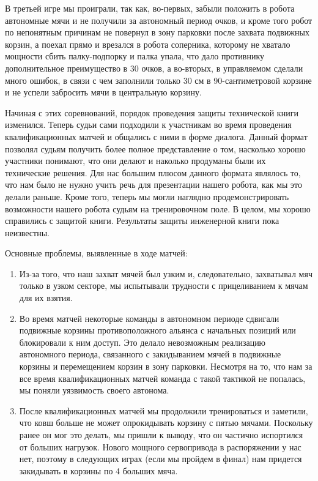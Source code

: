 В третьей игре мы проиграли, так как, во-первых, забыли положить в робота автономные мячи и не получили за автономный период очков, и кроме того робот по непонятным причинам не повернул в зону парковки после захвата подвижных корзин, а поехал прямо  и врезался в робота соперника, которому не хватало мощности сбить палку-подпорку и палка упала, что дало противнику дополнительное преимущество в 30 очков, а во-вторых, в управляемом сделали много ошибок, в связи с чем заполнили только 30 см в 90-сантиметровой корзине и не успели забросить мячи в центральную корзину.\newline

Начиная с этих соревнований, порядок проведения защиты технической книги изменился. Теперь судьи сами подходили к участникам во время проведения квалификационных матчей и общались с ними в форме диалога. Данный формат позволял судьям получить более полное представление о том, насколько хорошо участники понимают, что они делают и наколько продуманы были их технические решения. Для нас большим плюсом данного формата являлось то, что нам было не нужно учить речь для презентации нашего робота, как мы это делали раньше. Кроме того, теперь мы могли наглядно продемонстрировать возможности нашего робота судьям на тренировочном поле. В целом, мы хорошо справились с защитой книги. Результаты защиты инженерной книги пока неизвестны.\newline

Основные проблемы, выявленные в ходе матчей:
\begin{enumerate}
	\item Из-за того, что наш захват мячей был узким и, следовательно, захватывал мяч только в узком секторе, мы испытывали трудности с прицеливанием к мячам для их взятия. 
	
	\item Во время матчей некоторые команды в автономном периоде сдвигали подвижные корзины противоположного альянса с начальных позиций или блокировали к ним доступ. Это делало невозможным реализацию автономного периода, связанного с закидыванием мячей в подвижные корзины и перемещением корзин в зону парковки. Несмотря на то, что нам за все время квалификационных матчей команда с такой тактикой не попалась, мы поняли уязвимость своего автонома.
	
	\item После квалификационных матчей мы продолжили тренироваться и заметили, что ковш больше не может опрокидывать корзину с пятью мячами. Поскольку ранее он мог это делать, мы пришли к выводу, что он частично испортился от больших нагрузок. Нового мощного сервопривода в распоряжении у нас нет, поэтому в следующих играх (если мы пройдем в финал) нам придется закидывать в корзины по 4 больших мяча.
	
\end{enumerate} 

\fillpage